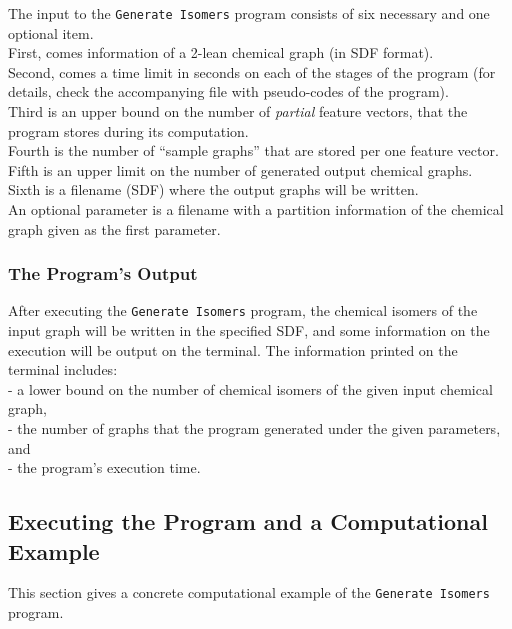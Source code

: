 \documentclass[11pt,titlepage,dvipdfmx,twoside]{article}
\begin{document}
The input to the {\tt Generate Isomers} program
consists of six necessary and one optional item. \\
First, comes information of a 2-lean chemical graph (in SDF format).\\
Second, comes a time limit in seconds on each of the stages of the program 
(for details, check the accompanying file with pseudo-codes of the program).\\
Third is an upper bound on the number of {\em partial} feature vectors, that the program stores
during its computation. \\
Fourth is the number of ``sample graphs'' that are stored per one feature vector.\\
Fifth is an upper limit on the number of generated output chemical graphs. \\
Sixth is a filename (SDF) where the output graphs will be written.\\
An optional parameter is a filename with a partition information of
the chemical graph given as the first parameter.



\subsubsection{The Program's Output}
\label{sec:Output_m}

After executing the {\tt Generate Isomers} program,
the chemical isomers of the input graph will be written
in the specified SDF, and some information on the execution will be output on 
the terminal.
The information printed on the terminal includes:\\
 - a lower bound on the number of chemical isomers of the given input chemical graph, \\
 - the number of graphs that the program generated under the given parameters, and \\
 - the program's execution time.
 


\subsection{Executing the Program and a Computational Example}
\label{sec:Example_m}

This section gives a concrete computational example of the {\tt Generate Isomers} program.
\end{document}
